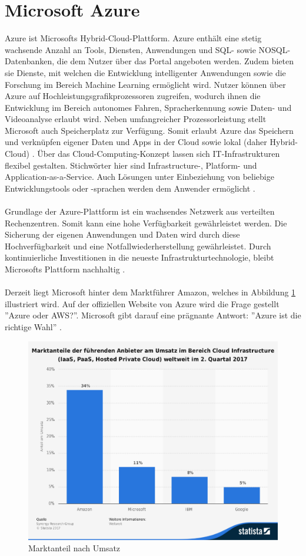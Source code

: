 \section{Microsoft Azure}
Azure ist Microsofts Hybrid-Cloud-Plattform. Azure enthält eine stetig wachsende Anzahl an Tools, Diensten, Anwendungen und SQL- sowie NOSQL-Datenbanken, die dem Nutzer über das Portal angeboten werden. Zudem bieten sie Dienste, mit welchen die Entwicklung intelligenter Anwendungen sowie die Forschung im Bereich Machine Learning ermöglicht wird. Nutzer können über Azure auf Hochleistungsgrafikprozessoren zugreifen, wodurch ihnen die Entwicklung im Bereich autonomes Fahren, Spracherkennung sowie Daten- und Videoanalyse erlaubt wird. Neben umfangreicher Prozessorleistung stellt Microsoft auch Speicherplatz zur Verfügung. Somit erlaubt Azure das Speichern und verknüpfen eigener Daten und Apps in der Cloud sowie lokal (daher Hybrid-Cloud) \cite{Sicherheit.2017b}. Über das Cloud-Computing-Konzept lassen sich IT-Infrastrukturen flexibel gestalten. Stichwörter hier sind Infrastructure-, Platform- und Application-as-a-Service. Auch Lösungen unter Einbeziehung von beliebige Entwicklungstools oder -sprachen werden dem Anwender ermöglicht \cite{Klein.2017}. \\ \\ 
Grundlage der Azure-Plattform ist ein wachsendes Netzwerk aus verteilten Rechenzentren. Somit kann eine hohe Verfügbarkeit gewährleistet werden. Die Sicherung der eigenen Anwendungen und Daten wird durch diese Hochverfügbarkeit und eine Notfallwiederherstellung gewährleistet. Durch kontinuierliche Investitionen in die neueste Infrastrukturtechnologie, bleibt Microsofts Plattform nachhaltig \cite{Klein.2017}.\\ \\
Derzeit liegt Microsoft hinter dem Marktführer Amazon, welches in Abbildung \ref{fig:statistik} illustriert wird. Auf der offiziellen Website von Azure wird die Frage gestellt ''Azure oder AWS?''. Microsoft gibt darauf eine prägnante Antwort: ''Azure ist die richtige Wahl'' \cite{Microsoft.2017}.
\begin{figure}[ht!]
	\centering
	\includegraphics[width=1.0\linewidth]{images/statistik}
	\caption{Marktanteil nach Umsatz \cite{Statista.2017b}} %
	\label{fig:statistik}
\end{figure}
